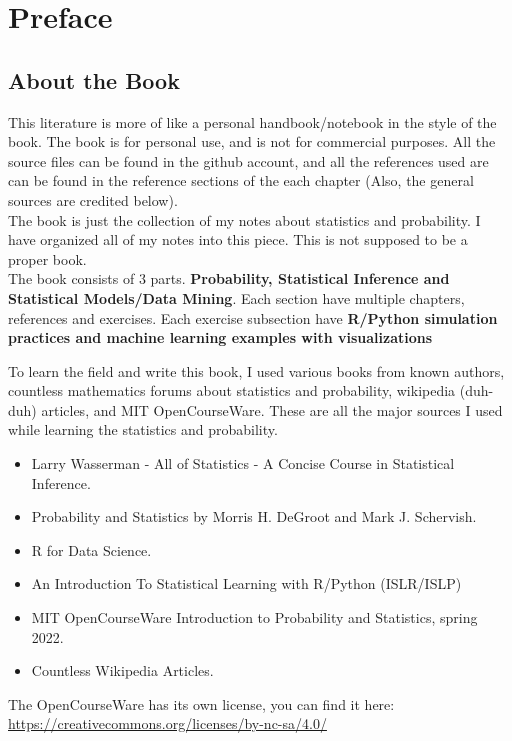 \chapter*{Preface}

\section*{About the Book}
This literature is more of like a personal handbook/notebook in the style of the book. The book is for personal use, and is not for commercial purposes. All the source files can be found in the github account, and all the references used are can be found in the reference sections of the each chapter (Also, the general sources are credited below).\\
The book is just the collection of my notes about statistics and probability. I have organized all of my notes into this piece. This is not supposed to be a proper book.\\
The book consists of $3$ parts. \textbf{Probability, Statistical Inference and Statistical Models/Data Mining}. Each section have multiple chapters, references and exercises. Each exercise subsection have \textbf{R/Python simulation practices and machine learning examples with visualizations}
\par
\par
To learn the field and write this book, I used various books from known authors, countless mathematics forums about statistics and probability, wikipedia (duh-duh) articles, and MIT OpenCourseWare. These are all the major sources I used while learning the statistics and probability. 
\begin{itemize}
    \item Larry Wasserman - All of Statistics - A Concise Course in Statistical Inference.
    \item Probability and Statistics by Morris H. DeGroot and Mark J. Schervish.
    \item R for Data Science.
    \item An Introduction To Statistical Learning with R/Python (ISLR/ISLP)
    \item MIT OpenCourseWare Introduction to Probability and Statistics, spring 2022.
    \item Countless Wikipedia Articles.
\end{itemize}

The OpenCourseWare has its own license, you can find it here: \url{https://creativecommons.org/licenses/by-nc-sa/4.0/}


